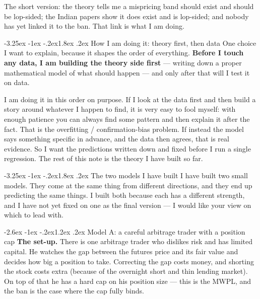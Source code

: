 \documentclass[11pt]{article}
\makeatletter
\renewcommand\section{\@startsection{section}{1}{\z@}%
  {-3.25ex \@plus -1ex \@minus -.2ex}{1.8ex \@plus.2ex}%
  {\normalfont\large\bfseries\color{owblue}}}
\renewcommand\subsection{\@startsection{subsection}{2}{\z@}%
  {-2.6ex \@plus -1ex \@minus -.2ex}{1.2ex \@plus.2ex}%
  {\normalfont\normalsize\bfseries\color{owblue}}}
\makeatother
\begin{document}
\noindent The short version: the theory tells me a mispricing band should exist and should be lop-sided; the Indian papers show it does exist and is lop-sided; and nobody has yet linked it to the ban. That link is what I am doing.

\section{How I am doing it: theory first, then data}
One choice I want to explain, because it shapes the order of everything. \textbf{Before I touch any data, I am building the theory side first} --- writing down a proper mathematical model of what should happen --- and only after that will I test it on data.

I am doing it in this order on purpose. If I look at the data first and then build a story around whatever I happen to find, it is very easy to fool myself: with enough patience you can always find some pattern and then explain it after the fact. That is the overfitting / confirmation-bias problem. If instead the model says something specific in advance, and the data then agrees, that is real evidence. So I want the predictions written down and fixed before I run a single regression. The rest of this note is the theory I have built so far.

\section{The two models I have built}
I have built two small models. They come at the same thing from different directions, and they end up predicting the same things. I built both because each has a different strength, and I have not yet fixed on one as the final version --- I would like your view on which to lead with.

\subsection{Model A: a careful arbitrage trader with a position cap}
\textbf{The set-up.} There is one arbitrage trader who dislikes risk and has limited capital. He watches the gap between the futures price and its fair value and decides how big a position to take. Correcting the gap costs money, and shorting the stock costs extra (because of the overnight short and thin lending market). On top of that he has a hard cap on his position size --- this is the MWPL, and the ban is the case where the cap fully binds.
\end{document}
